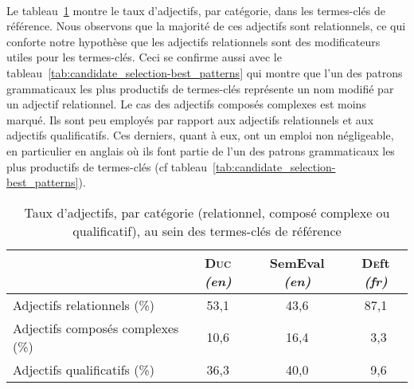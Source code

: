       ~\\Le tableau~\ref{tab:candidate_selection-adjective_categories} montre le
      taux d'adjectifs, par catégorie, dans les termes-clés de référence.
      Nous observons que la majorité de ces adjectifs sont relationnels, ce qui
      conforte notre hypothèse que les adjectifs relationnels sont des
      modificateurs utiles pour les termes-clés. Ceci se confirme aussi avec
      le tableau~\ref{tab:candidate_selection-best_patterns} qui montre que l'un
      des patrons grammaticaux les plus productifs de termes-clés représente un
      nom modifié par un adjectif relationnel. Le cas des adjectifs composés
      complexes est moins marqué. Ils sont peu employés par rapport aux
      adjectifs relationnels et aux adjectifs qualificatifs. Ces derniers, quant
      à eux, ont un emploi non négligeable, en particulier en anglais où ils
      font partie de l'un des patrons grammaticaux les plus productifs de
      termes-clés (cf tableau~\ref{tab:candidate_selection-best_patterns}).
      \begin{table}[!ht]
        \centering
          \begin{tabular}{l|ccc}
            \toprule
            & \textbf{\textsc{Duc}} \textit{(en)} & \textbf{SemEval} \textit{(en)} & \textbf{\textsc{De}ft} \textit{(fr)}\\
            \hline
            Adjectifs relationnels \hfill(\%) & 53,1 & 43,6 & 87,1\\
            Adjectifs composés complexes \hfill(\%) & 10,6 & 16,4 & $~~$3,3\\
            Adjectifs qualificatifs \hfill(\%) & 36,3 & 40,0 & $~~$9,6\\
            \bottomrule
        \end{tabular}
        \caption{Taux d'adjectifs, par catégorie (relationnel, composé complexe
                 ou qualificatif), au sein des termes-clés de référence}
                 \label{tab:candidate_selection-adjective_categories}
      \end{table}

